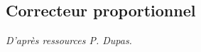 \documentclass[10pt,fleqn]{article} %
\begin{document}
\begin{multicols}{2}
%
%
%
%
%
%
%
%
%
%
%
%
%
%
%
%
%
\subsection*{Correcteur proportionnel}
\textit{D'après ressources P. Dupas.}



\end{multicols}
\end{document}
